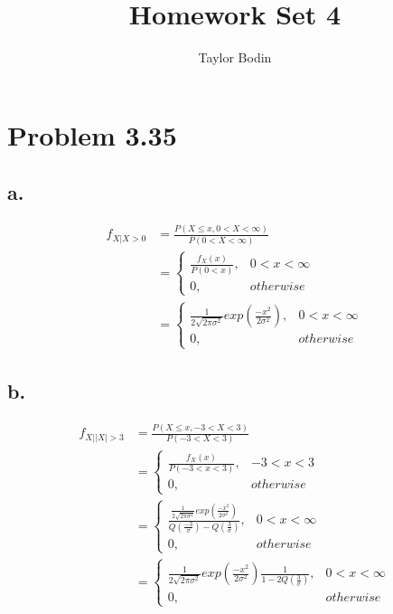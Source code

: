 \documentclass[12pt]{article}
\begin{document}
\title{Homework Set 4}
\author{Taylor Bodin}
\maketitle

\section*{Problem 3.35}
\subsection*{a.} %
\begin{align*}
  f_{X|X>0} &= \frac{P(X \leq x, 0<X<\infty)}{P(0<X<\infty)} \\
  &= \begin{cases} 
        \frac{f_X(x)}{P(0<x)}, & 0 < x < \infty \\
        0, & otherwise 
     \end{cases} \\
  &= \begin{cases} 
        \frac{1}{2\sqrt{2\pi\sigma^2}}exp(\frac{-x^2}{2\sigma^2}), & 0 < x < \infty \\
        0, & otherwise 
      \end{cases}
\end{align*}

\subsection*{b.} %
\begin{align*}
  f_{X||X|>3} &= \frac{P(X \leq x, -3<X<3)}{P(-3<X<3)} \\
  &= \begin{cases} 
    \frac{f_X(x)}{P(-3<x<3)}, & -3 < x < 3 \\
    0, & otherwise 
  \end{cases} \\
  &= \begin{cases} 
    \frac{\frac{1}{2\sqrt{2\pi\sigma^2}}exp(\frac{-x^2}{2\sigma^2})}
    {Q(\frac{-3}{\sigma}) - Q(\frac{3}{\sigma})}, & 0 < x < \infty \\
    0, & otherwise 
  \end{cases} \\
  &= \begin{cases} 
    \frac{1}{2\sqrt{2\pi\sigma^2}}exp(\frac{-x^2}{2\sigma^2})
    \frac{1}{1 - 2Q(\frac{3}{\sigma})}, & 0 < x < \infty \\
    0, & otherwise 
  \end{cases}
\end{align*}
\end{document}
